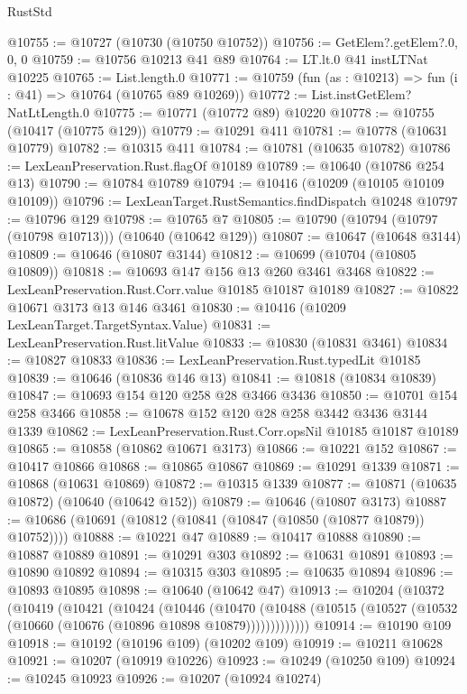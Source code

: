 \begin{lexlean}{RustStd}
\begin{coremodule}
@10755 := @10727 (@10730 (@10750 @10752))
@10756 := GetElem?.getElem?.{0, 0, 0}
@10759 := @10756 @10213 @41 @89
@10764 := LT.lt.{0} @41 instLTNat @10225
@10765 := List.length.{0}
@10771 := @10759 (fun (as : @10213) => fun (i : @41) => @10764 (@10765 @89 @10269))
@10772 := List.instGetElem?NatLtLength.{0}
@10775 := @10771 (@10772 @89) @10220
@10778 := @10755 (@10417 (@10775 @129))
@10779 := @10291 @411
@10781 := @10778 (@10631 @10779)
@10782 := @10315 @411
@10784 := @10781 (@10635 @10782)
@10786 := LexLeanPreservation.Rust.flagOf @10189
@10789 := @10640 (@10786 @254 @13)
@10790 := @10784 @10789
@10794 := @10416 (@10209 (@10105 @10109 @10109))
@10796 := LexLeanTarget.RustSemantics.findDispatch @10248
@10797 := @10796 @129
@10798 := @10765 @7
@10805 := @10790 (@10794 (@10797 (@10798 @10713))) (@10640 (@10642 @129))
@10807 := @10647 (@10648 @3144)
@10809 := @10646 (@10807 @3144)
@10812 := @10699 (@10704 (@10805 @10809))
@10818 := @10693 @147 @156 @13 @260 @3461 @3468
@10822 := LexLeanPreservation.Rust.Corr.value @10185 @10187 @10189
@10827 := @10822 @10671 @3173 @13 @146 @3461
@10830 := @10416 (@10209 LexLeanTarget.TargetSyntax.Value)
@10831 := LexLeanPreservation.Rust.litValue
@10833 := @10830 (@10831 @3461)
@10834 := @10827 @10833
@10836 := LexLeanPreservation.Rust.typedLit @10185
@10839 := @10646 (@10836 @146 @13)
@10841 := @10818 (@10834 @10839)
@10847 := @10693 @154 @120 @258 @28 @3466 @3436
@10850 := @10701 @154 @258 @3466
@10858 := @10678 @152 @120 @28 @258 @3442 @3436 @3144 @1339
@10862 := LexLeanPreservation.Rust.Corr.opsNil @10185 @10187 @10189
@10865 := @10858 (@10862 @10671 @3173)
@10866 := @10221 @152
@10867 := @10417 @10866
@10868 := @10865 @10867
@10869 := @10291 @1339
@10871 := @10868 (@10631 @10869)
@10872 := @10315 @1339
@10877 := @10871 (@10635 @10872) (@10640 (@10642 @152))
@10879 := @10646 (@10807 @3173)
@10887 := @10686 (@10691 (@10812 (@10841 (@10847 (@10850 (@10877 @10879)) @10752))))
@10888 := @10221 @47
@10889 := @10417 @10888
@10890 := @10887 @10889
@10891 := @10291 @303
@10892 := @10631 @10891
@10893 := @10890 @10892
@10894 := @10315 @303
@10895 := @10635 @10894
@10896 := @10893 @10895
@10898 := @10640 (@10642 @47)
@10913 := @10204
    (@10372
      (@10419
        (@10421
          (@10424
            (@10446
              (@10470
                (@10488 (@10515 (@10527 (@10532 (@10660 (@10676 (@10896 @10898 @10879)))))))))))))
@10914 := @10190 @109
@10918 := @10192 (@10196 @109) (@10202 @109)
@10919 := @10211 @10628
@10921 := @10207 (@10919 @10226)
@10923 := @10249 (@10250 @109)
@10924 := @10245 @10923
@10926 := @10207 (@10924 @10274)

\end{coremodule}
\end{lexlean}
